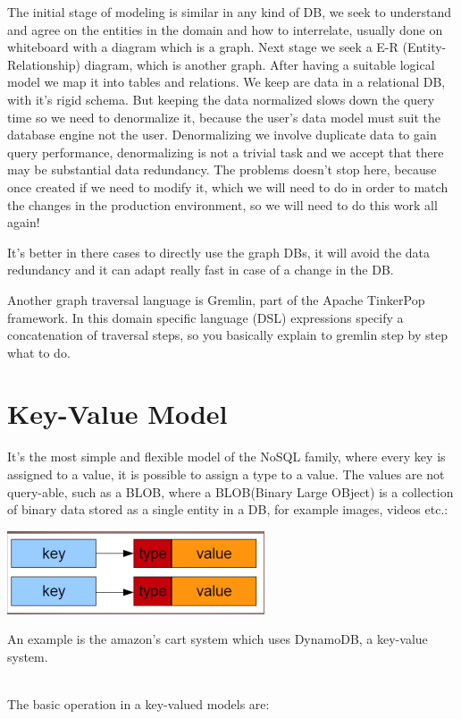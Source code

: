\documentclass[a4page, 11pt]{article}
\begin{document}
The initial stage of modeling is similar in any kind of DB, we seek to understand and agree on the entities in the domain and how to interrelate, usually done on whiteboard with a diagram which is a graph.
Next stage we seek a E-R (Entity-Relationship) diagram, which is another graph. 
After having a suitable logical model we map it into tables and relations. 
We keep are data in a relational DB, with it's rigid schema.
But keeping the data normalized slows down the query time so we need to denormalize it, because the user's data model must suit the database engine not the user. 
Denormalizing we involve duplicate data to gain query performance, denormalizing is not a trivial task and we accept that there may be substantial data redundancy. 
The problems doesn't stop here, because once created if we need to modify it, which we will need to do in order to match the changes in the production environment, so we will need to do this work all again!

It's better in there cases to directly use the graph DBs, it will avoid the data redundancy and it can adapt really fast in case of a change in the DB.

Another graph traversal language is Gremlin, part of the Apache TinkerPop framework. In this domain specific language (DSL) expressions specify a concatenation of traversal steps, so you basically explain to gremlin step by step what to do.

\section{Key-Value Model}

It's the most simple and flexible model of the NoSQL family, where every key is assigned to a value, it is possible to assign a type to a value.
The values are not query-able, such as a BLOB, where a BLOB(Binary Large OBject) is a collection of binary data stored as a single entity in a DB, for example images, videos etc.:
\begin{center}
\includegraphics[scale=0.5]{IMAGE3.jpg}
\end{center}
An example is the amazon's cart system which uses DynamoDB, a key-value system.

~\\
The basic operation in a key-valued models are:
\end{document}
